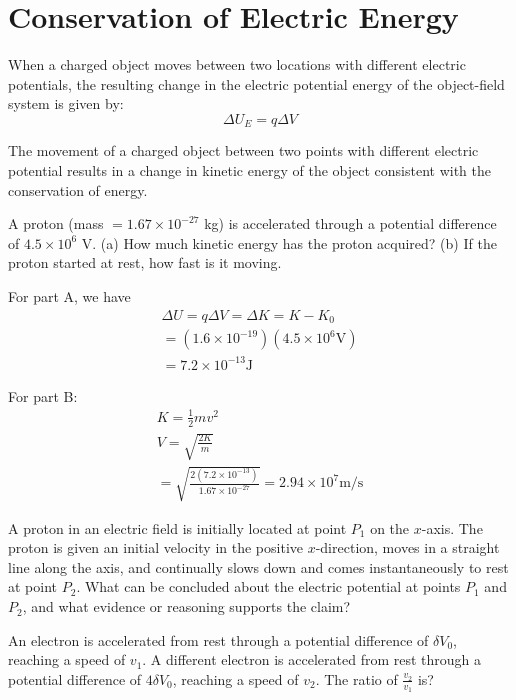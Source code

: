 \documentclass[../em.tex]{subfiles}
\begin{document}
\section{Conservation of Electric Energy}
When a charged object moves between two locations with different electric potentials, the resulting change in the electric potential energy
of the object-field system is given by:
\[\Delta U_E=q\Delta V\]

The movement of a charged object between two points with different electric potential results in a change in kinetic
energy of the object consistent with the conservation of energy.

\begin{example}
    A proton (mass $=1.67\times10^{-27}$ kg) is accelerated through a potential difference of $4.5\times10^6$ V.
    (a) How much kinetic energy has the proton acquired? (b) If the proton started at rest, how fast is it moving.

    For part A, we have
    \begin{align*}
    \Delta U = q\Delta V = \Delta K = K-K_0 \\
    = (1.6\times10^{-19})(4.5\times10^6\text{V})\\
    = 7.2\times10^{-13}\text{J}
    \end{align*}

    For part B:
    \begin{align*}
        K = \frac{1}{2}mv^2\\
        V = \sqrt{\frac{2K}{m}}\\
        = \sqrt{\frac{2(7.2\times10^{-13})}{1.67\times10^{-27}}}=2.94\times10^7\text{m/s}
    \end{align*}
    
\end{example}
\ex A proton in an electric field is initially located at point $P_1$ on the $x$-axis. The proton is given an initial velocity in the positive $x$-direction, moves in a straight line along the axis, and 
continually slows down and comes instantaneously to rest at point $P_2$. What can be concluded about the electric potential at points $P_1$ and $P_2$, and what evidence or reasoning supports the claim?

\ex An electron is accelerated from rest through a potential difference of $\delta V_0$, reaching a speed of $v_1$. A different electron is accelerated from rest through a potential difference of $4\delta V_0$, reaching a speed of $v_2$. The ratio of $\frac{v_2}{v_1}$ is?
\end{document}
